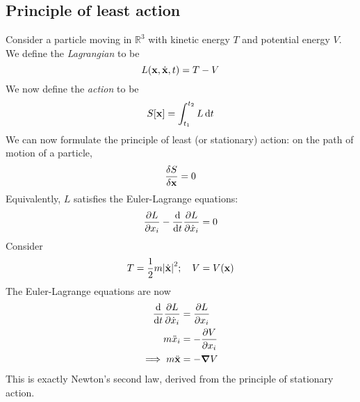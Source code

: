 \subsection{Principle of least action}
Consider a particle moving in \( \mathbb R^3 \) with kinetic energy \( T \) and potential energy \( V \).
We define the \textit{Lagrangian} to be
\[
	L(\vb x, \dot {\vb x}, t) = T - V
\]
We now define the \textit{action} to be
\[
	S[\vb x] = \int_{t_1}^{t_2} L \dd{t}
\]
We can now formulate the principle of least (or stationary) action: on the path of motion of a particle,
\[
	\fdv{S}{\vb x} = 0
\]
Equivalently, \( L \) satisfies the Euler-Lagrange equations:
\[
	\pdv{L}{x_i} - \dv{t}\pdv{L}{\dot x_i} = 0
\]
Consider
\[
	T = \frac{1}{2}m\abs{\dot{\vb x}}^2;\quad V = V(\vb x)
\]
The Euler-Lagrange equations are now
\begin{align*}
	\dv{t}\pdv{L}{\dot x_i} & = \pdv{L}{x_i}  \\
	m \ddot x_i             & = -\pdv{V}{x_i} \\
	\implies m \ddot{\vb x} & = -\grad V
\end{align*}
This is exactly Newton's second law, derived from the principle of stationary action.
